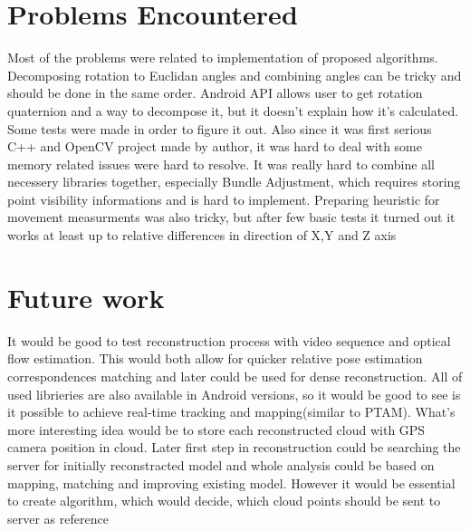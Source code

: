 \section{Problems Encountered}
Most of the problems were related to implementation of proposed algorithms. Decomposing rotation to Euclidan angles and combining angles can be tricky and should be done in the same order. Android API allows user to get rotation quaternion and a way to decompose it, but it doesn't explain how it's calculated. Some tests were made in order to figure it out. Also since it was first serious C++ and OpenCV project made by author, it was hard to deal with some memory related issues were hard to resolve. It was really hard to combine all necessery libraries together, especially Bundle Adjustment, which requires storing point visibility informations and is hard to implement.
Preparing heuristic for movement measurments was also tricky, but after few basic tests it turned out it works at least up to relative differences in direction of X,Y and Z axis
\section{Future work}
It would be good to test reconstruction process with video sequence and optical flow estimation. This would both allow for quicker relative pose estimation correspondences matching and later could be used for dense reconstruction. All of used librieries are also available in Android versions, so it would be good to see is it possible to achieve real-time tracking and mapping(similar to PTAM). What's more interesting idea would be to store each reconstructed cloud with GPS camera position in cloud. Later first step in reconstruction could be searching the server for initially reconstracted model and whole analysis could be based on mapping, matching and improving existing model. However it would be essential to create algorithm, which would decide, which cloud points should be sent to server as reference



